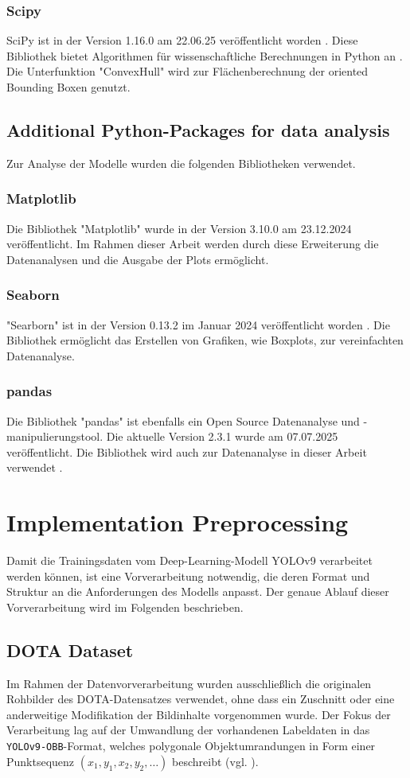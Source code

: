 \subsubsection{Scipy}
SciPy ist in der Version 1.16.0 am 22.06.25 veröffentlicht worden \cite{scipy-main}. Diese Bibliothek bietet Algorithmen für wissenschaftliche Berechnungen in Python an \cite{scipy-main}. Die Unterfunktion "ConvexHull" wird zur Flächenberechnung der oriented Bounding Boxen genutzt.
\subsection{Additional Python-Packages for data analysis}
Zur Analyse der Modelle wurden die folgenden Bibliotheken verwendet.
\subsubsection*{Matplotlib}
Die Bibliothek "Matplotlib" wurde in der Version 3.10.0 am 23.12.2024 veröffentlicht\cite{matplotlib}. Im Rahmen dieser Arbeit werden durch diese Erweiterung die Datenanalysen und die Ausgabe der Plots ermöglicht.
\subsubsection*{Seaborn}
"Searborn" ist in der Version 0.13.2 im Januar 2024 veröffentlicht worden \cite{seaborn}. Die Bibliothek ermöglicht das Erstellen von Grafiken, wie Boxplots, zur vereinfachten Datenanalyse.
\subsubsection*{pandas}
Die Bibliothek "pandas" ist ebenfalls ein Open Source Datenanalyse und -manipulierungstool. Die aktuelle Version 2.3.1 wurde am 07.07.2025 veröffentlicht. Die Bibliothek wird auch zur Datenanalyse in dieser Arbeit verwendet \cite{pandas}.

\section{Implementation Preprocessing}
Damit die Trainingsdaten vom Deep-Learning-Modell YOLOv9 verarbeitet werden können, ist eine Vorverarbeitung notwendig, die deren Format und Struktur an die Anforderungen des Modells anpasst. Der genaue Ablauf dieser Vorverarbeitung wird im Folgenden beschrieben.
\subsection{DOTA Dataset}
Im Rahmen der Datenvorverarbeitung wurden ausschließlich die originalen Rohbilder des \acrshort{DOTA}-Datensatzes verwendet, ohne dass ein Zuschnitt oder eine anderweitige Modifikation der Bildinhalte vorgenommen wurde. Der Fokus der Verarbeitung lag auf der Umwandlung der vorhandenen Labeldaten in das \texttt{YOLOv9-OBB}-Format, welches polygonale Objektumrandungen in Form einer Punktsequenz \((x_1, y_1, x_2, y_2, \ldots)\) beschreibt (vgl. ).

